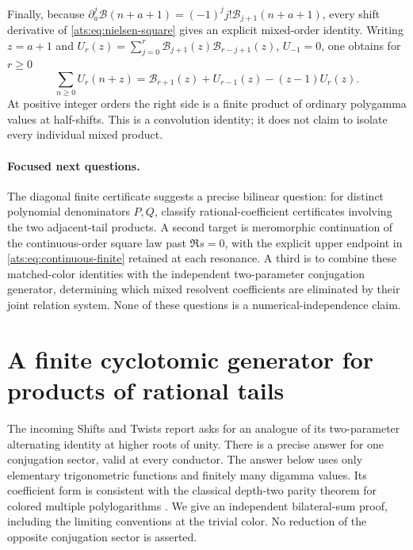 \documentclass[11pt,a4paper]{article}
\numberwithin{equation}{section}
\theoremstyle{definition}
\theoremstyle{remark}
\begin{document}
Finally, because $\partial_a^j\mathcal B(n+a+1)=
(-1)^j j!\mathcal B_{j+1}(n+a+1)$, every shift derivative of
\eqref{ats:eq:nielsen-square} gives an explicit mixed-order identity.
Writing $z=a+1$ and
$U_r(z)=\sum_{j=0}^{r}\mathcal B_{j+1}(z)\mathcal B_{r-j+1}(z)$,
$U_{-1}=0$, one obtains for $r\ge0$
\begin{equation}\label{ats:eq:shift-convolution}
 \sum_{n\ge0}U_r(n+z)
 =\mathcal B_{r+1}(z)+U_{r-1}(z)-(z-1)U_r(z).
\end{equation}
At positive integer orders the right side is a finite product of
ordinary polygamma values at half-shifts.  This is a convolution
identity; it does not claim to isolate every individual mixed product.

\paragraph{Focused next questions.}
The diagonal finite certificate suggests a precise bilinear question:
for distinct polynomial denominators $P,Q$, classify rational-coefficient
certificates involving the two adjacent-tail products. A second target
is meromorphic continuation of the continuous-order square law past
$\Re s=0$, with the explicit upper endpoint in
\eqref{ats:eq:continuous-finite} retained at each resonance. A third is
to combine these matched-color identities with the independent
two-parameter conjugation generator, determining which mixed resolvent
coefficients are eliminated by their joint relation system. None of
these questions is a numerical-independence claim.


\section{A finite cyclotomic generator for products of rational tails}
\label{cyc:sec}

The incoming Shifts and Twists report \cite{HTST} asks for an analogue of its two-parameter
alternating identity at higher roots of unity.  There is a precise answer
for one conjugation sector, valid at every conductor.  The answer below
uses only elementary trigonometric functions and finitely many digamma
values.  Its coefficient form is consistent with the classical
depth-two parity theorem for colored multiple polylogarithms
\cite{PanzerParity}.  We give an independent bilateral-sum proof, including
the limiting conventions at the trivial color.  No reduction of the
opposite conjugation sector is asserted.
\end{document}
